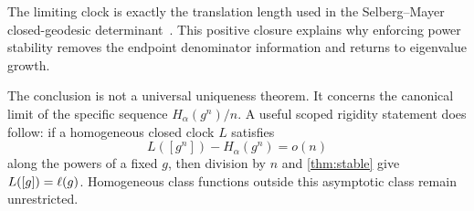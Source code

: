 The limiting clock is exactly the translation length used in the
Selberg--Mayer closed-geodesic determinant~\cite{Selberg1956,Mayer1991}.  This
positive closure explains why enforcing power stability removes the endpoint
denominator information and returns to eigenvalue growth.

The conclusion is not a universal uniqueness theorem.  It concerns the
canonical limit of the specific sequence $H_\alpha(g^n)/n$.  A useful scoped
rigidity statement does follow: if a homogeneous closed clock $L$ satisfies
\[
 L([g^n])-H_\alpha(g^n)=o(n)
\]
along the powers of a fixed $g$, then division by $n$ and
\cref{thm:stable} give $L([g])=\ell(g)$.  Homogeneous class functions
outside this asymptotic class remain unrestricted.
